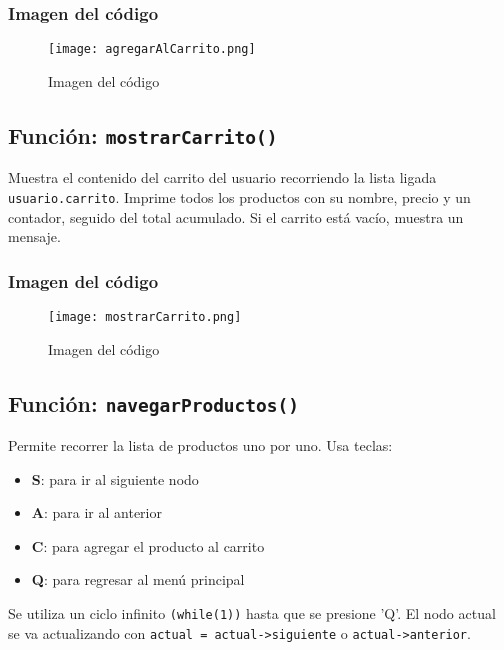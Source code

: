 \documentclass{article}
\begin{document}
   \subsubsection{Imagen del código}
   
\begin{figure}[!ht]
\centering
\texttt{[image: agregarAlCarrito.png]}
\caption{Imagen del código}
\end{figure}

   \subsection{Función: \texttt{mostrarCarrito()}}
   Muestra el contenido del carrito del usuario recorriendo la lista ligada \texttt{usuario.carrito}. Imprime todos los productos con su nombre, precio y un contador, seguido del total acumulado. Si el carrito está vacío, muestra un mensaje.

   \subsubsection{Imagen del código}
   
\begin{figure}[!ht]
\centering
\texttt{[image: mostrarCarrito.png]}
\caption{Imagen del código}
\end{figure}
   
   \subsection{Función: \texttt{navegarProductos()}}
   Permite recorrer la lista de productos uno por uno. Usa teclas:
\begin{itemize}
    \item \textbf{S}: para ir al siguiente nodo

    \item \textbf{A}: para ir al anterior

    \item \textbf{C}: para agregar el producto al carrito

    \item \textbf{Q}: para regresar al menú principal
\end{itemize}

Se utiliza un ciclo infinito \texttt{(while(1))} hasta que se presione 'Q'. El nodo actual se va actualizando con \texttt{actual = actual->siguiente} o \texttt{actual->anterior}.
\end{document}
